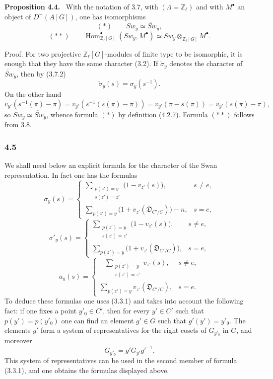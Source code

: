 \documentclass[11pt]{article}
\newenvironment{statement}[1]{\par\medskip\noindent\textbf{#1.}\ }{\par\medskip}
\DeclareMathOperator{\Hom}{Hom}
\providecommand{\Hom}{\operatorname{Hom}}
\begin{document}
\begin{statement}{Proposition 4.4}
With the notation of 3.7, with $(\Lambda=\mathbb Z_\ell)$ and with $M^\bullet$ an object of $D^+(A[G])$, one has isomorphisms
\[
(*)\qquad Sw_y\simeq \check{Sw}_y,
\]
\[
(**)\qquad
\Hom^\bullet_{\mathbb Z_\ell[G]}(Sw_y,M^\bullet)
\simeq Sw_y\otimes_{\mathbb Z_\ell[G]}M^\bullet.
\]
\end{statement}

Proof. For two projective $\mathbb Z_\ell[G]$-modules of finite type to be isomorphic, it is enough that they have the same character (3.2). If $\check\sigma_y$ denotes the character of $\check{Sw}_y$, then by (3.7.2)
\[
\check\sigma_y(s)=\sigma_y(s^{-1}).
\]
On the other hand
\[
v_{y'}(s^{-1}(\pi)-\pi)
=v_{y'}(s^{-1}(s(\pi)-\pi))
=v_{y'}(\pi-s(\pi))
=v_{y'}(s(\pi)-\pi),
\]
so $Sw_y\simeq\check{Sw}_y$, whence formula $(*)$ by definition (4.2.7). Formula $(**)$ follows from 3.8.

\subsubsection*{4.5}

We shall need below an explicit formula for the character of the Swan representation. In fact one has the formulas
\[
\sigma_y(s)=
\begin{cases}
\displaystyle\sum_{\substack{p(z')=y\\s(z')=z'}}\bigl(1-v_{z'}(s)\bigr),& s\ne e,\\[0.8em]
\displaystyle\sum_{p(z')=y}\bigl(1+v_{z'}(\mathfrak D_{C'/C})\bigr)-n,& s=e,
\end{cases}
\tag{4.5.1}
\]
\[
\sigma'_y(s)=
\begin{cases}
\displaystyle\sum_{\substack{p(z')=y\\s(z')=z'}}\bigl(1-v_{z'}(s)\bigr),& s\ne e,\\[0.8em]
\displaystyle\sum_{p(z')=y}\bigl(1+v_{z'}(\mathfrak D_{C'/C})\bigr),& s=e,
\end{cases}
\tag{4.5.2}
\]
\[
a_y(s)=
\begin{cases}
\displaystyle-\sum_{\substack{p(z')=y\\s(z')=z'}}v_{z'}(s),& s\ne e,\\[0.8em]
\displaystyle\sum_{p(z')=y}v_{z'}(\mathfrak D_{C'/C}),& s=e.
\end{cases}
\tag{4.5.3}
\]
To deduce these formulas one uses (3.3.1) and takes into account the following fact: if one fixes a point $y'_0\in C'$, then for every $y'\in C'$ such that $p(y')=p(y'_0)$ one can find an element $g'\in G$ such that $g'(y')=y'_0$. The elements $g'$ form a system of representatives for the right cosets of $G_{y'_0}$ in $G$, and moreover
\[
G_{y'_0}=g'G_{y'}g'^{-1}.
\]
This system of representatives can be used in the second member of formula (3.3.1), and one obtains the formulas displayed above.
\end{document}
